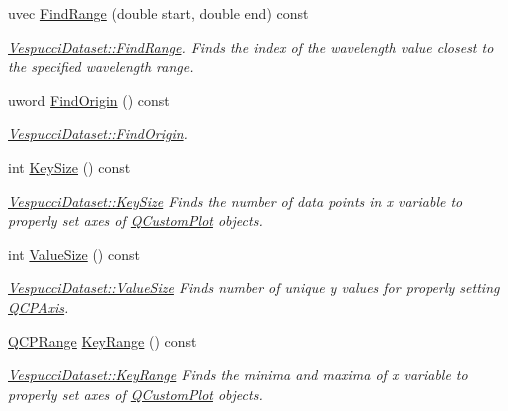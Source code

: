 \begin{DoxyCompactItemize}
\item 
uvec \hyperlink{class_vespucci_dataset_aad915b5294010084faa6f3224b6ba782}{Find\+Range} (double start, double end) const 
\begin{DoxyCompactList}\small\item\em \hyperlink{class_vespucci_dataset_aad915b5294010084faa6f3224b6ba782}{Vespucci\+Dataset\+::\+Find\+Range}. Finds the index of the wavelength value closest to the specified wavelength range. \end{DoxyCompactList}\item 
uword \hyperlink{class_vespucci_dataset_a1ece07436a185be5b05540552d77ac47}{Find\+Origin} () const 
\begin{DoxyCompactList}\small\item\em \hyperlink{class_vespucci_dataset_a1ece07436a185be5b05540552d77ac47}{Vespucci\+Dataset\+::\+Find\+Origin}. \end{DoxyCompactList}\item 
int \hyperlink{class_vespucci_dataset_ad953c5c4063dd525f18c5c1728a1f49b}{Key\+Size} () const 
\begin{DoxyCompactList}\small\item\em \hyperlink{class_vespucci_dataset_ad953c5c4063dd525f18c5c1728a1f49b}{Vespucci\+Dataset\+::\+Key\+Size} Finds the number of data points in x variable to properly set axes of \hyperlink{class_q_custom_plot}{Q\+Custom\+Plot} objects. \end{DoxyCompactList}\item 
int \hyperlink{class_vespucci_dataset_a1961390fdca34d7ee493292191172460}{Value\+Size} () const 
\begin{DoxyCompactList}\small\item\em \hyperlink{class_vespucci_dataset_a1961390fdca34d7ee493292191172460}{Vespucci\+Dataset\+::\+Value\+Size} Finds number of unique y values for properly setting \hyperlink{class_q_c_p_axis}{Q\+C\+P\+Axis}. \end{DoxyCompactList}\item 
\hyperlink{class_q_c_p_range}{Q\+C\+P\+Range} \hyperlink{class_vespucci_dataset_a534c0a8ea1c2d033e51f1141d2a12d6c}{Key\+Range} () const 
\begin{DoxyCompactList}\small\item\em \hyperlink{class_vespucci_dataset_a534c0a8ea1c2d033e51f1141d2a12d6c}{Vespucci\+Dataset\+::\+Key\+Range} Finds the minima and maxima of x variable to properly set axes of \hyperlink{class_q_custom_plot}{Q\+Custom\+Plot} objects. \end{DoxyCompactList}\item 

\end{DoxyCompactItemize}
